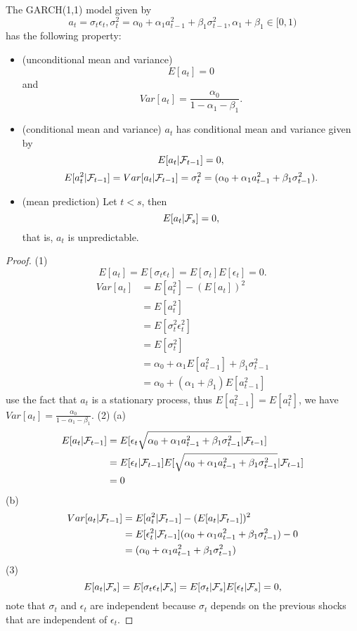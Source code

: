 \begin{theorem}\cite[132]{tsay2005analysis}\label{ch:time-series-analysis:th:basicStatisticalPropertiesGARCH(1,1)}
	The GARCH(1,1) model given by
	$$a_t = \sigma_t \epsilon_t, \sigma_t^2 = \alpha_0 + \alpha_1a_{t-1}^2 + \beta_1\sigma_{t-1}^2,\alpha_1+\beta_1\in [0,1)$$
	has the following property:
\begin{itemize}
	\item (unconditional mean and variance) 
		$$E[a_t] = 0$$
	and
	$$Var[a_t] = \frac{\alpha_0}{1-\alpha_1-\beta_1}.$$
	\item (conditional mean and variance) $a_t$ has conditional mean and variance given by
	$$E[a_t|\mathcal{F}_{t-1}] = 0,$$ 
	$$E[a_t^2|\mathcal{F}_{t-1}] = Var[a_t|\mathcal{F}_{t-1}] = \sigma_t^2 = (\alpha_0 + \alpha_1 a_{t-1}^2 + \beta_1 \sigma_{t-1}^2).$$
		\item (mean prediction) Let $t < s$, then 
$$E[a_t|\mathcal{F}_s] = 0,$$
that is, $a_t$ is unpredictable.
\end{itemize}	
\end{theorem}
\begin{proof}
(1) $$E[a_t] = E[\sigma_t\epsilon_t]=E[\sigma_t]E[\epsilon_t] = 0.$$
 \begin{align*}
Var[a_t] &= E[a_t^2] - (E[a_t])^2\\
&=E[a_t^2] \\
&=E[\sigma_t^2\epsilon_t^2]\\
&=E[\sigma_t^2]\\
&=\alpha_0 + \alpha_1E[a_{t-1}^2] + \beta_1\sigma_{t-1}^2\\
&=\alpha_0 + (\alpha_1 + \beta_1)E[a_{t-1}^2]
\end{align*}
use the fact that $a_t$ is a stationary process, thus $E[a_{t-1}^2] = E[a_t^2]$, we have $Var[a_t] = \frac{\alpha_0}{1-\alpha_1-\beta_1}$.	
(2)
(a)
\begin{align*}
E[a_t|\mathcal{F}_{t-1}] &= E[\epsilon_{t}\sqrt{\alpha_0 + \alpha_1 a_{t-1}^2 + \beta_1 \sigma_{t-1}^2}|\mathcal{F}_{t-1}] \\
&= E[\epsilon_t|\mathcal{F}_{t-1}]E[\sqrt{\alpha_0 + \alpha_1 a_{t-1}^2 + \beta_1 \sigma_{t-1}^2}|\mathcal{F}_{t-1}] \\
&= 0
\end{align*}
(b)
\begin{align*}
Var[a_t|\mathcal{F}_{t-1}] &= E[a_t^2|\mathcal{F}_{t-1}] - (E[a_t|\mathcal{F}_{t-1}])^2 \\
&= E[\epsilon_t^2|\mathcal{F}_{t-1}](\alpha_0 + \alpha_1 a_{t-1}^2 + \beta_1 \sigma_{t-1}^2) - 0 \\
&= (\alpha_0 + \alpha_1 a_{t-1}^2 + \beta_1 \sigma_{t-1}^2)
\end{align*}
	(3) 
$$E[a_t|\mathcal{F}_s] = E[\sigma_t \epsilon_t|\mathcal{F}_s] = E[\sigma_t|\mathcal{F}_s]E[ \epsilon_t|\mathcal{F}_s] = 0,$$
note that $\sigma_t$ and $\epsilon_t$ are independent because $\sigma_t$ depends on the previous shocks that are independent of $\epsilon_t$.
\end{proof}


